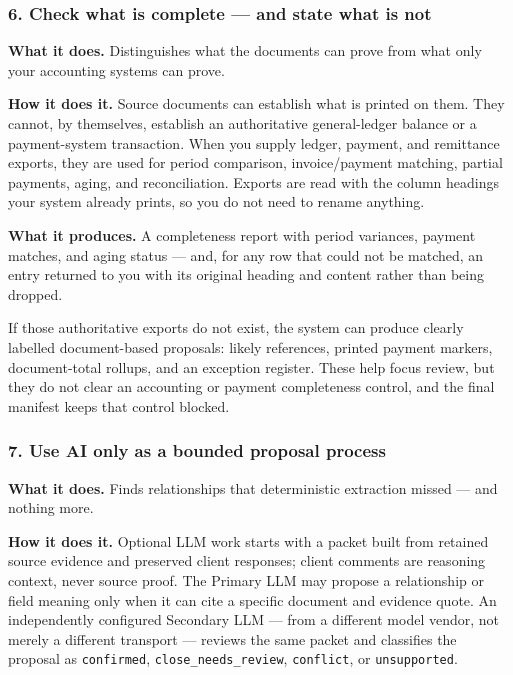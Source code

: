 \documentclass[
]{article}
\begin{document}
\subsubsection{6. Check what is complete --- and state what is
not}\label{check-what-is-complete-and-state-what-is-not}

\textbf{What it does.} Distinguishes what the documents can prove from
what only your accounting systems can prove.

\textbf{How it does it.} Source documents can establish what is printed
on them. They cannot, by themselves, establish an authoritative
general-ledger balance or a payment-system transaction. When you supply
ledger, payment, and remittance exports, they are used for period
comparison, invoice/payment matching, partial payments, aging, and
reconciliation. Exports are read with the column headings your system
already prints, so you do not need to rename anything.

\textbf{What it produces.} A completeness report with period variances,
payment matches, and aging status --- and, for any row that could not be
matched, an entry returned to you with its original heading and content
rather than being dropped.

If those authoritative exports do not exist, the system can produce
clearly labelled document-based proposals: likely references, printed
payment markers, document-total rollups, and an exception register.
These help focus review, but they do not clear an accounting or payment
completeness control, and the final manifest keeps that control blocked.

\subsubsection{7. Use AI only as a bounded proposal
process}\label{use-ai-only-as-a-bounded-proposal-process}

\textbf{What it does.} Finds relationships that deterministic extraction
missed --- and nothing more.

\textbf{How it does it.} Optional LLM work starts with a packet built
from retained source evidence and preserved client responses; client
comments are reasoning context, never source proof. The Primary LLM may
propose a relationship or field meaning only when it can cite a specific
document and evidence quote. An independently configured Secondary LLM
--- from a different model vendor, not merely a different transport ---
reviews the same packet and classifies the proposal as
\texttt{confirmed},
\texttt{close\_\allowbreak{}needs\_\allowbreak{}review},
\texttt{conflict}, or \texttt{unsupported}.
\end{document}
